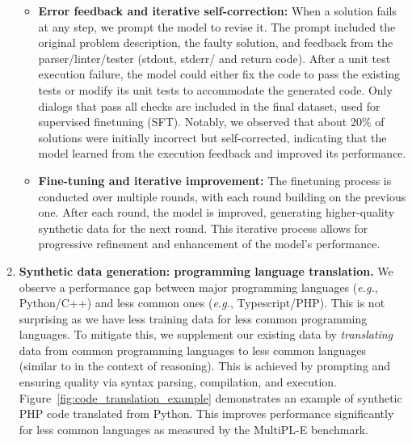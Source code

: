 \documentclass[dvipsnames]{fairmeta}
\begin{document}
\begin{enumerate}
\begin{itemize}
        
        \item \textbf{Error feedback and iterative self-correction:}
        When a solution fails at any step, we prompt the model to revise it. The prompt included the original problem description, the faulty solution, and feedback from the parser/linter/tester (stdout, stderr/ and return code). 
        After a unit test execution failure, the model could either fix the code to pass the existing tests or modify its unit tests to accommodate the generated code.
        Only dialogs that pass all checks are included in the final dataset, used for supervised finetuning (SFT). Notably, we observed that about 20\% of solutions were initially incorrect but self-corrected, indicating that the model learned from the execution feedback and improved its performance.
        
        \item \textbf{Fine-tuning and iterative improvement:} The finetuning process is conducted over multiple rounds, with each round building on the previous one. After each round, the model is improved, generating higher-quality synthetic data for the next round. This iterative process allows for progressive refinement and enhancement of the model's performance.
    \end{itemize}

    \item{\textbf{Synthetic data generation: programming language translation.}} We observe a performance gap between major programming languages (\emph{e.g.}, Python/C++) and less common ones (\emph{e.g.}, Typescript/PHP). This is not surprising as we have less training data for less common programming languages. To mitigate this, we supplement our existing data by \emph{translating} data from common programming languages to less common languages (similar to \cite{chen2023breakinglanguagebarriersmultilingual} in the context of reasoning). This is achieved by prompting \llamathree and ensuring quality via syntax parsing, compilation, and execution. Figure~\ref{fig:code_translation_example} demonstrates an example of synthetic PHP code translated from Python. This improves performance significantly for less common languages as measured by the MultiPL-E \citep{cassano2022multiple} benchmark. 
    

\end{enumerate}
\end{document}

